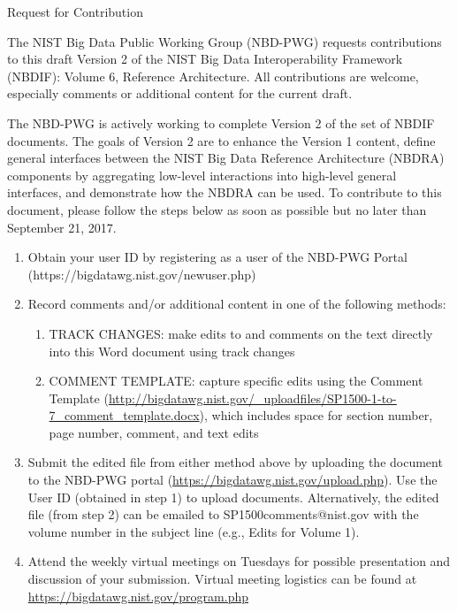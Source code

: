 Request for Contribution

The NIST Big Data Public Working Group (NBD-PWG) requests
contributions to this draft Version 2 of the NIST Big Data
Interoperability Framework (NBDIF): Volume 6, Reference Architecture.
All contributions are welcome, especially comments or additional
content for the current draft. 

The NBD-PWG is actively working to complete Version 2 of the set of NBDIF documents. The goals of Version 2 are to enhance the Version 1 content, define general interfaces between the NIST Big Data Reference Architecture (NBDRA) components by aggregating low-level interactions into high-level general interfaces, and demonstrate how the NBDRA can be used. 
To contribute to this document, please follow the steps below as soon as possible but no later than September 21, 2017.

\begin{enumerate}

\item	Obtain your user ID by registering as a user of the NBD-PWG
  Portal (https://bigdatawg.nist.gov/newuser.php)
\item	Record comments and/or additional content in one of the
  following methods:

  \begin{enumerate}

  \item {TRACK CHANGES:} make edits to and comments on the text
    directly into this Word document using track changes

    \item {COMMENT TEMPLATE:} capture specific edits using the Comment
      Template
      (\url{http://bigdatawg.nist.gov/_uploadfiles/SP1500-1-to-7_comment_template.docx}),
      which includes space for section number, page number, comment,
      and text edits

\end{enumerate}

\item Submit the edited file from either method above by uploading the
  document to the NBD-PWG portal
  (\url{https://bigdatawg.nist.gov/upload.php}). Use the User ID
  (obtained in step 1) to upload documents. Alternatively, the edited
  file (from step 2) can be emailed to SP1500comments@nist.gov with
  the volume number in the subject line (e.g., Edits for Volume 1).

\item	Attend the weekly virtual meetings on Tuesdays for possible
  presentation and discussion of your submission. Virtual meeting
  logistics can be found at
  \url{https://bigdatawg.nist.gov/program.php}
\end{enumerate}


